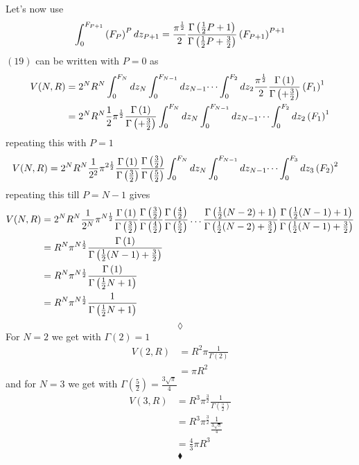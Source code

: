 Let's now use 
$$\int_0^{F_{P+1}} \left(F_P\right)^P dz_{P+1}=\frac{\pi^{\frac{1}{2}}}{2}\frac{\Gamma\left(\frac{1}{2} P+1\right)}{\Gamma\left(\frac{1}{2} P+\frac{3}{2}\right)}\left(F_{P+1}\right)^{P+1}$$
$(19)$ can be written with $P=0$ as 
\begin{align}
V(N, R) &= 2^N R^N\int_{0}^{F_{N}}dz_N\int_{0}^{F_{N-1}}dz_{N-1}\dots\int_{0}^{F_{2}}dz_{2}\frac{\pi^{\frac{1}{2}}}{2}\frac{\Gamma\left(1\right)}{\Gamma\left(+\frac{3}{2}\right)}\left(F_{1}\right)^{1}\\
&= 2^N R^N\frac{1}{2}\pi^{\frac{1}{2}}\frac{\Gamma\left(1\right)}{\Gamma\left(+\frac{3}{2}\right)}\int_{0}^{F_{N}}dz_N\int_{0}^{F_{N-1}}dz_{N-1}\dots\int_{0}^{F_{2}}dz_{2}\left(F_{1}\right)^{1}
\end{align}
repeating  this with $P=1$
\begin{align}
V(N, R) &=2^N R^N\frac{1}{2^2}\pi^{2\frac{1}{2}}\frac{\Gamma\left(1\right)}{\Gamma\left(\frac{3}{2}\right)}\frac{\Gamma\left(\frac{3}{2}\right)}{\Gamma\left( \frac{5}{2}\right)}\int_{0}^{F_{N}}dz_N\int_{0}^{F_{N-1}}dz_{N-1}\dots\int_{0}^{F_{3}}dz_{3}\left(F_{2}\right)^{2}
\end{align}
repeating this till $P= N-1$ gives 
\begin{align}
V(N, R) &=2^N R^N\frac{1}{2^N}\pi^{N\frac{1}{2}}\frac{\Gamma\left(1\right)}{\Gamma\left(\frac{3}{2}\right)}\frac{\Gamma\left(\frac{3}{2}\right)}{\Gamma\left( \frac{4}{2}\right)}\frac{\Gamma\left(\frac{4}{2}\right)}{\Gamma\left( \frac{5}{2}\right)}\dots\frac{\Gamma\left(\frac{1}{2}(N-2)+1\right)}{\Gamma\left(\frac{1}{2}(N-2)+\frac{3}{2}\right)}\frac{\Gamma\left(\frac{1}{2}(N-1)+1\right)}{\Gamma\left(\frac{1}{2}(N-1)+\frac{3}{2}\right)}\\
&= R^N\pi^{N\frac{1}{2}}\frac{\Gamma\left(1\right)}{\Gamma\left(\frac{1}{2}(N-1)+\frac{3}{2}\right)}\\
&= R^N\pi^{N\frac{1}{2}}\frac{\Gamma\left(1\right)}{\Gamma\left(\frac{1}{2} N+1\right)}\\
&= R^N\pi^{N\frac{1}{2}}\frac{1}{\Gamma\left(\frac{1}{2} N+1\right)}
\end{align}
$$\lozenge$$
For $N=2$ we get with $\Gamma\left(2\right)=1$
\begin{align}
V(2, R) &= R^2\pi\frac{1}{\Gamma\left(2\right)}\\
&= \pi R^2
\end{align}
and for $N=3$ we get with $\Gamma\left(\frac{5}{2}\right)=\frac{3\sqrt{\pi}}{4}$
\begin{align}
V(3, R) &= R^3\pi^{\frac{3}{2}}\frac{1}{\Gamma\left(\frac{5}{2}\right)}\\
&= R^3\pi^{\frac{3}{2}}\frac{1}{\frac{3\sqrt{\pi}}{4}}\\
&= \frac{4}{3}\pi R^3
\end{align}
$$\blacklozenge$$
\newpage


